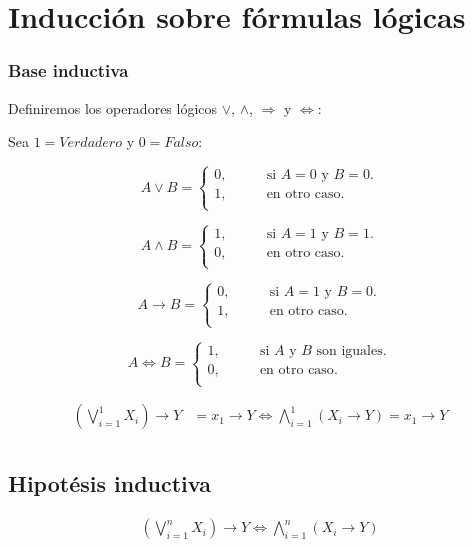 \section{Inducción sobre fórmulas lógicas}
\subsubsection{Base inductiva}
Definiremos los operadores lógicos $\vee$, $\wedge$, $\Rightarrow$ y $\Leftrightarrow$:

Sea $1=Verdadero$ y $0=Falso$:

\[ A \vee B =
 \begin{cases}
 0,	\qquad& \text{si $A=0$ y $B=0$}.\\
 1,	\qquad& \text{en otro caso}.\\
\end{cases} \]

\[ A \wedge B =
 \begin{cases}
 1, 	\qquad& \text{si $A=1$ y $B=1$}.\\
 0,	 	\qquad& \text{en otro caso}.\\
\end{cases} \]

\[ A \rightarrow B =
 \begin{cases}
 0,	 	\qquad& \text{si $A=1$ y $B=0$}.\\
 1,		\qquad& \text{en otro caso}.\\
\end{cases} \]

\[ A \Leftrightarrow B =
 \begin{cases}
 1, 	\qquad& \text{si $A$ y $B$ son iguales}.\\
 0,	 	\qquad& \text{en otro caso}.\\
\end{cases} \]


\begin{align}
\left(\bigvee\limits_{i=1}^{1}X_i\right)\rightarrow Y &= x_1 \rightarrow Y \Leftrightarrow \bigwedge\limits_{i=1}^{1}(X_i\rightarrow Y) = x_1\rightarrow Y \label{EQ:ORATORIA_BI_1}\\
\end{align}

\subsection{Hipotésis inductiva} 
\begin{align}
\left(\bigvee\limits_{i=1}^{n}X_i\right)\rightarrow Y \Leftrightarrow \bigwedge\limits_{i=1}^{n}(X_i\rightarrow Y) 
\end{align}

